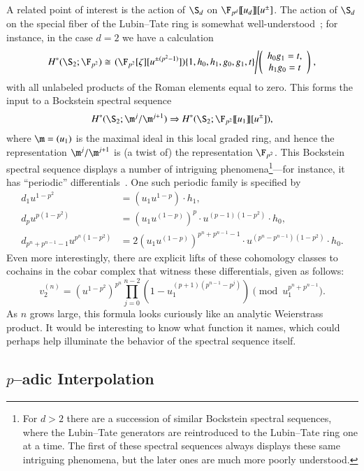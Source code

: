 A related point of interest is the action of $\S_d$ on $\F_{p^d}\ps{u_d}[u^\pm]$.  The action of $\S_d$ on the special fiber of the Lubin--Tate ring is somewhat well-understood~\cite{RavenelCohomologyStabAlgs}; for instance, in the case $d = 2$ we have a calculation \[H^*(\S_2; \F_{p^2}) \cong \left.(\F_{p^2}[\zeta][u^{\pm(p^2-1)}])\{1, h_0, h_1, g_0, g_1, t\}\middle/\left(\begin{array}{c} h_0 g_1 = t, \\ h_1 g_0 = t \end{array}\right)\right. ,\] with all unlabeled products of the Roman elements equal to zero.  This forms the input to a Bockstein spectral sequence \[H^*(\S_2; \m^j / \m^{j+1}) \Rightarrow H^*(\S_2; \F_{p^2}\ps{u_1}[u^\pm]),\] where $\m = (u_1)$ is the maximal ideal in this local graded ring, and hence the representation $\m^j / \m^{j+1}$ is (a twist of) the representation $\F_{p^2}$.  This Bockstein spectral sequence displays a number of intriguing phenomena\footnote{For $d > 2$ there are a succession of similar Bockstein spectral sequences, where the Lubin--Tate generators are reintroduced to the Lubin--Tate ring one at a time.  The first of these spectral sequences always displays these same intriguing phenomena, but the later ones are much more poorly understood.}---for instance, it has ``periodic'' differentials~\cite{Sadofsky}.  One such periodic family is specified by
\begin{align*}
d_1 u^{1-p^2} & = (u_1 u^{1-p}) \cdot h_1, \\
d_p u^{p(1-p^2)} & = (u_1 u^{(1-p)})^p \cdot u^{(p-1)(1-p^2)} \cdot h_0, \\
d_{p^n+p^{n-1}-1} u^{p^n(1-p^2)} & = 2 (u_1 u^{(1-p)})^{p^n + p^{n-1} - 1} \cdot u^{(p^n - p^{n-1})(1 - p^2)} \cdot h_0.
\end{align*}
Even more interestingly, there are explicit lifts of these cohomology classes to cochains in the cobar complex that witness these differentials, given as follows: \[v_2^{(n)} = (u^{1-p^2})^{p^n} \prod_{j=0}^{n-2} \left(1 - u_1^{(p+1)(p^{n-1} - p^j)} \right) \pmod{u_1^{p^n + p^{n-1}}}.\]  As $n$ grows large, this formula looks curiously like an analytic Weierstrass product.  It would be interesting to know what function it names, which could perhaps help illuminate the behavior of the spectral sequence itself.





\subsection*{$p$--adic Interpolation}


